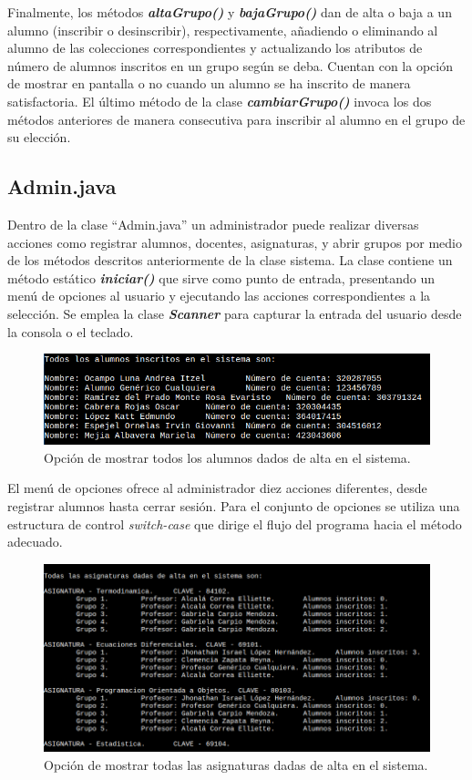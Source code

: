 \documentclass[a4paper,12pt]{article}
\begin{document}
Finalmente, los métodos \textbf{\textit{altaGrupo()}} y \textbf{\textit{bajaGrupo()}} dan de alta o baja a un alumno (inscribir o desinscribir), respectivamente, añadiendo o eliminando al alumno de las colecciones correspondientes y actualizando los atributos de número de alumnos inscritos en un grupo según se deba. Cuentan con la opción de mostrar en pantalla o no cuando un alumno se ha inscrito de manera satisfactoria. El último método de la clase \textbf{\textit{cambiarGrupo()}} invoca los dos métodos anteriores de manera consecutiva para inscribir al alumno en el grupo de su elección.

\subsection{Admin.java}

Dentro de la clase “Admin.java” un administrador puede realizar diversas acciones como registrar alumnos, docentes, asignaturas, y abrir grupos por medio de los métodos descritos anteriormente de la clase sistema. La clase contiene un método estático \textbf{\textit{iniciar()}} que sirve como punto de entrada, presentando un menú de opciones al usuario y ejecutando las acciones correspondientes a la selección. Se emplea la clase \textbf{\textit{Scanner}} para capturar la entrada del usuario desde la consola o el teclado.

\begin{figure}[ht]
    \centering
    \includegraphics[width=.9\textwidth]{media/alumnos.png}
    \caption{Opción de mostrar todos los alumnos dados de alta en el sistema.}
    \label{fig:mostrara_alumnos}
\end{figure}

El menú de opciones ofrece al administrador diez acciones diferentes, desde registrar alumnos hasta cerrar sesión. Para el conjunto de opciones se utiliza una estructura de control \textit{switch-case} que dirige el flujo del programa hacia el método adecuado.

\begin{figure}[ht]
    \centering
    \includegraphics[width=.9\textwidth]{media/asignaturas.png}
    \caption{Opción de mostrar todas las asignaturas dadas de alta en el sistema.}
    \label{fig:abrir_grupo}
\end{figure}
\end{document}
